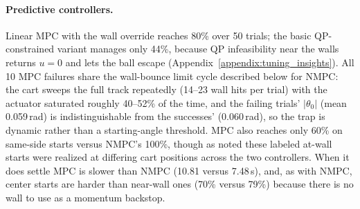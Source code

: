 \paragraph{Predictive controllers.}
Linear MPC with the wall override reaches 80\% over 50 trials; the basic
QP-constrained variant manages only 44\%, because QP infeasibility near the
walls returns $u=0$ and lets the ball escape (Appendix~\ref{appendix:tuning_insights}).
All 10 MPC failures share the wall-bounce limit cycle described below for
NMPC: the cart sweeps the full track repeatedly (14--23 wall hits per trial)
with the actuator saturated roughly 40--52\% of the time, and the failing trials'
$|\theta_0|$ (mean 0.059\,rad) is indistinguishable from the successes'
(0.060\,rad), so the trap is dynamic rather than a starting-angle threshold.
MPC also reaches only 60\% on same-side starts versus NMPC's 100\%, though
as noted these labeled at-wall starts were realized at differing cart
positions across the two controllers. When it does settle MPC is slower than NMPC (10.81 versus
7.48\,s), and, as with NMPC, center starts are harder than near-wall ones
(70\% versus 79\%) because there is no wall to use as a momentum backstop.

